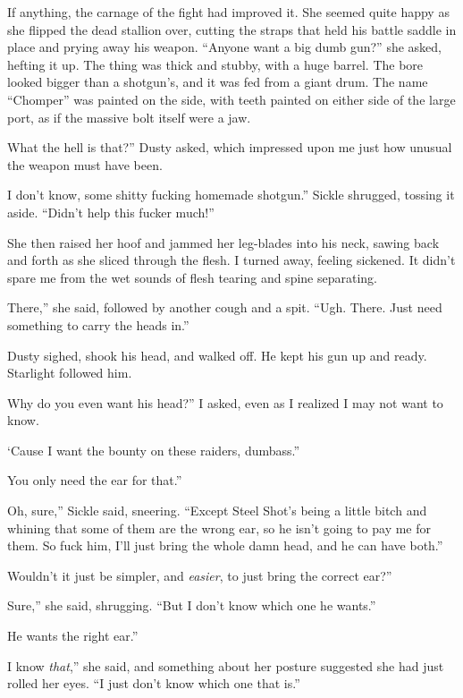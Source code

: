 If anything, the carnage of the fight had improved it. She seemed quite happy as she flipped the dead stallion over, cutting the straps that held his battle saddle in place and prying away his weapon. “Anyone want a big dumb gun?” she asked, hefting it up. The thing was thick and stubby, with a huge barrel. The bore looked bigger than a shotgun’s, and it was fed from a giant drum. The name “Chomper” was painted on the side, with teeth painted on either side of the large port, as if the massive bolt itself were a jaw.

\leavevmode{}What the hell is that?” Dusty asked, which impressed upon me just how unusual the weapon must have been.

\leavevmode{}I don’t know, some shitty fucking homemade shotgun.” Sickle shrugged, tossing it aside. “Didn’t help this fucker much!”

She then raised her hoof and jammed her leg-blades into his neck, sawing back and forth as she sliced through the flesh. I turned away, feeling sickened. It didn’t spare me from the wet sounds of flesh tearing and spine separating.

\leavevmode{}There,” she said, followed by another cough and a spit. “Ugh. There. Just need something to carry the heads in.”

Dusty sighed, shook his head, and walked off. He kept his gun up and ready. Starlight followed him.

\leavevmode{}Why do you even want his head?” I asked, even as I realized I may not want to know.

\leavevmode{}‘Cause I want the bounty on these raiders, dumbass.”

\leavevmode{}You only need the ear for that.”

\leavevmode{}Oh, sure,” Sickle said, sneering. “Except Steel Shot’s being a little bitch and whining that some of them are the wrong ear, so he isn’t going to pay me for them. So fuck him, I’ll just bring the whole damn head, and he can have both.”

\leavevmode{}Wouldn’t it just be simpler, and \textit{easier}, to just bring the correct ear?”

\leavevmode{}Sure,” she said, shrugging. “But I don’t know which one he wants.”

\leavevmode{}He wants the right ear.”

\leavevmode{}I know \textit{that},” she said, and something about her posture suggested she had just rolled her eyes. “I just don’t know which one that is.”

